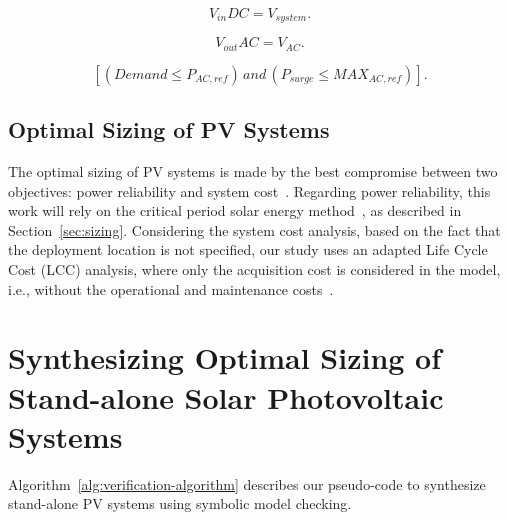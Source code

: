 \documentclass[runningheads]{llncs}
\begin{document}
\begin{equation}
\label{eq:vindc} 
V_{in}DC = V_{system}.
\end{equation}

\begin{equation}
\label{eq:voutac} 
V_{out}AC = V_{AC}.
\end{equation}

\begin{equation}
\label{eq:invcheck} 
\left[ (Demand \leq P_{AC,ref}) \, and \, (P_{surge} \leq MAX_{AC,ref}) \right].
\end{equation}

\subsection{Optimal Sizing of PV Systems}
%
The optimal sizing of PV systems is made by the best compromise between two objectives: power reliability and system cost~\cite{Alsadi2018}. 
Regarding power reliability, this work will rely on the critical period solar energy method~\cite{Pinho}, as described in Section~\ref{sec:sizing}. 
Considering the system cost analysis, based on the fact that the deployment location is not specified, our study uses an adapted Life Cycle Cost (LCC) analysis, where only the acquisition cost is considered in the model, i.e., without the operational and maintenance costs~\cite{Alsadi2018}.

\section{Synthesizing Optimal Sizing of Stand-alone Solar Photovoltaic Systems}
Algorithm~\ref{alg:verification-algorithm} describes our pseudo-code to synthesize stand-alone PV systems using symbolic model checking. 
\end{document}
